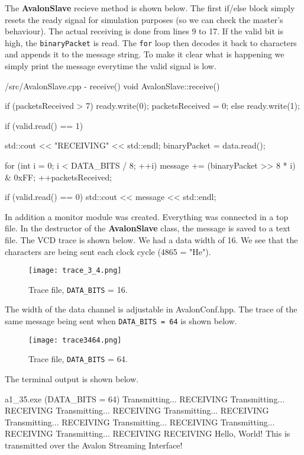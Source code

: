 \documentclass[../main.tex]{subfiles}
\begin{document}
\newpage

The \textbf{AvalonSlave} recieve method is shown below. The first if/else block simply resets the ready signal for simulation purposes (so we can check the master's behaviour). The actual receiving is done from lines 9 to 17. If the valid bit is high, the \texttt{binaryPacket} is read. The \texttt{for} loop then decodes it back to characters and appends it to the message string. To make it clear what is happening we simply print the message everytime the valid signal is low.

\begin{myminted}{/src/AvalonSlave.cpp - receive()}
void AvalonSlave::receive() {
    if (packetsReceived > 7) {
        ready.write(0);
        packetsReceived = 0;
    } else {
        ready.write(1);
    }

    if (valid.read() == 1) {
        std::cout << "RECEIVING" << std::endl;
        binaryPacket = data.read();

        for (int i = 0; i < DATA_BITS / 8; ++i) {
            message += (binaryPacket >> 8 * i) & 0xFF;
        }
        ++packetsReceived;
    }

    if (valid.read() == 0) {
        std::cout << message << std::endl;
    }
}
\end{myminted}

In addition a monitor module was created. Everything was connected in a top file. In the destructor of the \textbf{AvalonSlave} class, the message is saved to a text file. The VCD trace is shown below. We had a data width of 16. We see that the characters are being sent each clock cycle (4865 = "He").

\begin{figure}[h]
    \centering
    \texttt{[image: trace\_3\_4.png]}
    \vspace*{2pt}
    \caption{Trace file, \texttt{DATA\_BITS} = 16.}
\end{figure}

The width of the data channel is adjustable in AvalonConf.hpp. The trace of the same message being sent when \texttt{DATA\_BITS = 64} is shown below.

\begin{figure}[h]
    \centering
    \texttt{[image: trace3464.png]}
    \vspace*{2pt}
    \caption{Trace file, \texttt{DATA\_BITS} = 64.}
\end{figure}

\newpage

The terminal output is shown below.

\begin{mintedterminal}{a1\_35.exe (DATA\_BITS = 64)}
Transmitting...
RECEIVING
Transmitting...
RECEIVING
Transmitting...
RECEIVING
Transmitting...
RECEIVING
Transmitting...
RECEIVING
Transmitting...
RECEIVING
Transmitting...
RECEIVING
Transmitting...
RECEIVING
RECEIVING
Hello, World!
This is transmitted over the Avalon Streaming Interface!
\end{mintedterminal}
\end{document}
